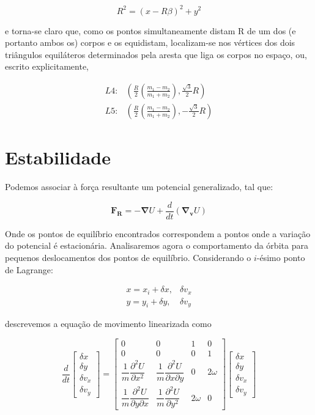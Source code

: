 \begin{equation}
    R^2=(x-R\beta)^2+y^2
\end{equation}

e torna-se claro que, como os pontos simultaneamente distam R de um dos (e portanto ambos os) corpos e os equidistam, localizam-se nos vértices dos dois triângulos equiláteros determinados pela aresta que liga os corpos no espaço, ou, escrito explicitamente,

\begin{align}
    L4: & \left(\frac{R}{2}\left(\frac{m_1 - m_2}{m_1 + m_2}\right),\frac{\sqrt{3}}{2}R\right) \\
    L5: & \left(\frac{R}{2}\left(\frac{m_1 - m_2}{m_1 + m_2}\right),-\frac{\sqrt{3}}{2}R\right)
\end{align}

\section{Estabilidade}

Podemos associar à força resultante um potencial generalizado, tal que:

\begin{equation}
\mathbf{F_R} = \mathbf{-\nabla} U + \frac{d}{dt}(\mathbf{\nabla _v}U)
\end{equation}

Onde os pontos de equilíbrio encontrados correspondem a pontos onde a variação do potencial é estacionária. Analisaremos agora o comportamento da órbita para pequenos deslocamentos dos pontos de equilíbrio. Considerando o $i$-ésimo ponto de Lagrange:

\begin{eqnarray}
x = x_i + \delta x, & \delta v_x \\
y = y_i + \delta y, & \delta v_y
\end{eqnarray}

descrevemos a equação de movimento linearizada como

\begin{equation}
\frac{d}{dt}
  \begin{bmatrix}
    \delta x \\
    \delta y \\
    \delta v_x \\
    \delta v_y
 \end{bmatrix}
=
 \begin{bmatrix}
   0 & 0 & 1 & 0 \\
   0 & 0 & 0 & 1 \\
   \dfrac{1}{m} \dfrac{\partial ^2U}{\partial x^2} & \dfrac{1}{m} \dfrac{\partial ^2U}{\partial x\partial y} & 0 & 2\omega \\
   \dfrac{1}{m} \dfrac{\partial ^2U}{\partial y \partial x} & \dfrac{1}{m} \dfrac{\partial ^2U}{\partial y^2} & 2\omega & 0
 \end{bmatrix}
   \begin{bmatrix}
    \delta x \\
    \delta y \\
    \delta v_x \\
    \delta v_y
 \end{bmatrix}
\end{equation}

